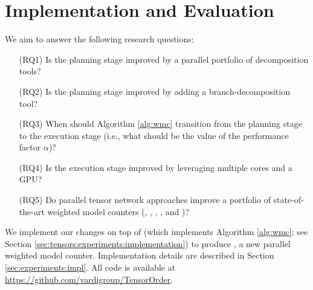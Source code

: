 \section{Implementation and Evaluation}
\label{sec:experiments}

We aim to answer the following research questions:

\begin{enumerate}\itemsep0em 
    \item[(RQ1)] Is the planning stage improved by a parallel portfolio of decomposition tools?
    
    \item[(RQ2)] Is the planning stage improved by adding a branch-decomposition tool?
    
    \item[(RQ3)] When should Algorithm \ref{alg:wmc} transition from the planning stage to the execution stage (i.e., what should be the value of the performance factor $\alpha$)?
    
    \item[(RQ4)] Is the execution stage improved by leveraging multiple cores and a GPU?
    
    \item[(RQ5)] Do parallel tensor network approaches improve a portfolio of state-of-the-art weighted model counters (, , , , and )?
\end{enumerate}

We implement our changes on top of  \cite{DDV19} (which implements Algorithm \ref{alg:wmc}; see Section \ref{sec:tensors:experiments:implementation}) to produce , a new parallel weighted model counter. Implementation details are described in Section \ref{sec:experiments:impl}. All code is available at  \url{https://github.com/vardigroup/TensorOrder}.

